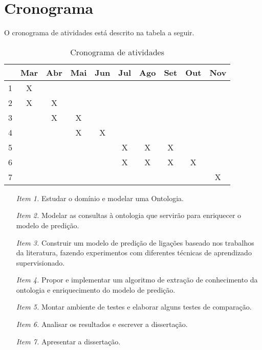 \chapter{Cronograma}
\label{cap:cronograma}

O cronograma de atividades está descrito na tabela a seguir.

\begin{table}[h!]
    \centering
    \begin{tabular}{|c|c|c|c|c|c|c|c|c|c|}
     \hline
       & Mar & Abr & Mai & Jun & Jul & Ago & Set & Out & Nov \\
     \hline\hline
     1 & X &   &   &   &   &   &   &   &   \\
     \hline
     2 & X & X &   &   &   &   &   &   &   \\
     \hline
     3 &   & X & X &   &   &   &   &   &   \\
     \hline
     4 &   &   & X & X &   &   &   &   &   \\
     \hline
     5 &   &   &   &   & X & X & X &   &   \\
     \hline
     6 &   &   &   &   & X & X & X & X &   \\
     \hline
     7 &   &   &   &   &   &   &   &   & X \\
     \hline
    \end{tabular}
    \caption{Cronograma de atividades}
    \label{cronograma-atividades}
\end{table}

\begin{itemize}
    \item [\textit{Item 1.}] Estudar o domínio e modelar uma Ontologia.
    \item [\textit{Item 2.}] Modelar as consultas à ontologia que servirão para enriquecer o modelo de predição.
    \item [\textit{Item 3.}] Construir um modelo de predição de ligações baseado nos trabalhos da literatura, fazendo experimentos com diferentes técnicas de aprendizado supervisionado.
    \item [\textit{Item 4.}] Propor e implementar um algoritmo de extração de conhecimento da ontologia e enriquecimento do modelo de predição.
    \item [\textit{Item 5.}] Montar ambiente de testes e elaborar alguns testes de comparação.
    \item [\textit{Item 6.}] Analisar os resultados e escrever a dissertação.
    \item [\textit{Item 7.}] Apresentar a dissertação.

\end{itemize}
